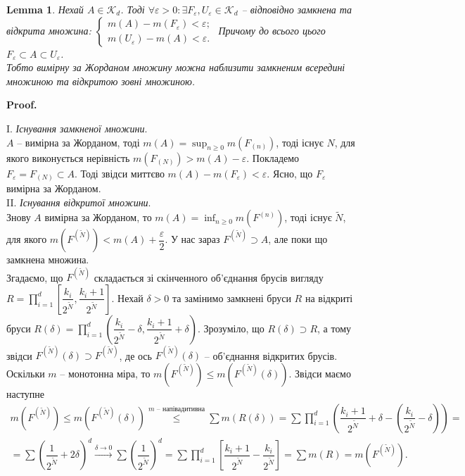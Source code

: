 \documentclass[a4paper, 10pt]{article}
\makeatletter
\theoremstyle{theoremdd}
\newtheorem{lemma}[theorem]{Lemma}
\renewenvironment{proof}[1][Proof.\\]{\par
\pushQED{\hfill \qed}%
\normalfont \topsep6\p@\@plus6\p@\relax
\trivlist
\item\relax
{\bfseries
#1\@addpunct{.}}\hspace\labelsep\ignorespaces
}{%
\popQED\endtrivlist\@endpefalse
}
\makeatother
\begin{document}
\begin{lemma}
Нехай $A \in \mathcal{K}_d$. Тоді $\forall \varepsilon > 0: \exists F_\varepsilon, U_\varepsilon \in \mathcal{K}_d$ -- відповідно замкнена та відкрита множина: $\begin{cases} m(A) - m(F_\varepsilon) < \varepsilon; \\ m(U_\varepsilon) - m(A) < \varepsilon. \end{cases}$ Причому до всього цього $F_\varepsilon \subset A \subset U_\varepsilon$.\\
Тобто вимірну за Жорданом множину можна наблизити замкненим всередині множиною та відкритою зовні множиною.
\end{lemma}

\begin{proof}
I. \textit{Існування замкненої множини}.\\
$A$ -- вимірна за Жорданом, тоді $m(A) = \displaystyle\sup_{n \geq 0} m(F_{(n)})$, тоді існує $N$, для якого виконується нерівність $m(F_{(N)}) > m(A) - \varepsilon$. Покладемо $F_\varepsilon = F_{(N)} \subset A$. Тоді звідси миттєво $m(A) - m(F_\varepsilon) < \varepsilon$. Ясно, що $F_\varepsilon$ вимірна за Жорданом.
\bigskip \\
II. \textit{Існування відкритої множини}.\\
Знову $A$ вимірна за Жорданом, то $m(A) = \displaystyle\inf_{n \geq 0} m(F^{(n)})$, тоді існує $\tilde{N}$, для якого $m(F^{(\tilde{N})}) < m(A) + \dfrac{\varepsilon}{2}$. У нас зараз $F^{(\tilde{N})} \supset A$, але поки що замкнена множина.\\
Згадаємо, що $F^{(\tilde{N})}$ складається зі скінченного об'єднання брусів вигляду $R = \displaystyle\prod_{i=1}^d \left[ \dfrac{k_i}{2^{\tilde{N}}}, \dfrac{k_i+1}{2^{\tilde{N}}} \right]$. Нехай $\delta > 0$ та замінимо замкнені бруси $R$ на відкриті бруси $R(\delta) =\displaystyle \prod_{i=1}^d \left( \dfrac{k_i}{2^{\tilde{N}}} - \delta, \dfrac{k_i+1}{2^{\tilde{N}}}+\delta \right)$. Зрозуміло, що $R(\delta) \supset R$, а тому звідси $F^{(\tilde{N})}(\delta) \supset F^{(\tilde{N})}$, де ось $F^{(\tilde{N})}(\delta)$ -- об'єднання відкритих брусів. Оскільки $m$ -- монотонна міра, то $m(F^{(\tilde{N})}) \leq m(F^{(\tilde{N})}(\delta))$. Звідси маємо наступне
\begin{align*}
m(F^{(\tilde{N})}) \leq m(F^{(\tilde{N})}(\delta)) \overset{m \text{ -- напівадитивна}}{\leq} \displaystyle\sum m(R(\delta)) = \sum \prod_{i=1}^d \left( \dfrac{k_i+1}{2^{\tilde{N}}} + \delta - \left(\dfrac{k_i}{2^{\tilde{N}}} - \delta  \right)\right) = \\ = \sum \left( \dfrac{1}{2^{\tilde{N}}} + 2 \delta \right)^d \xrightarrow{\delta \to 0} \sum \left( \dfrac{1}{2^{\tilde{N}}} \right)^d = \sum \prod_{i=1}^d \left[ \dfrac{k_i+1}{2^{\tilde{N}}} - \dfrac{k_i}{2^{\tilde{N}}} \right] = \sum m(R) = m(F^{(\tilde{N})}).

\end{align*}
\end{proof}
\end{document}
